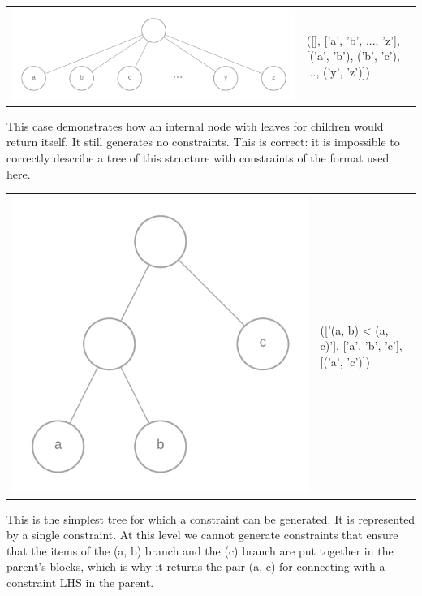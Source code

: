 \documentclass[11pt]{article} %
\begin{document}
\begin{center}
\begin{tabular}{>{\centering}m{} >{\centering\arraybackslash}m{}}
	\includegraphics[scale=0.1]{traverse2} & ([], ['a', 'b', ..., 'z'], [('a', 'b'), ('b', 'c'), ..., ('y', 'z')])
\end{tabular}
\end{center}
This case demonstrates how an internal node with leaves for children would return itself. It still generates no constraints. This is correct: it is impossible to correctly describe a tree of this structure with constraints of the format used here.

\hfill

\begin{center}
\begin{tabular}{>{\centering}m{} >{\centering\arraybackslash}m{}}
	\includegraphics[scale=0.1]{traverse3} & (['(a, b) < (a, c)'], ['a', 'b', 'c'], [('a', 'c')])
\end{tabular}
\end{center}
This is the simplest tree for which a constraint can be generated. It is represented by a single constraint. At this level we cannot generate constraints that ensure that the items of the (a, b) branch and the (c) branch are put together in the parent's blocks, which is why it returns the pair (a, c) for connecting with a constraint LHS in the parent.
\end{document}
